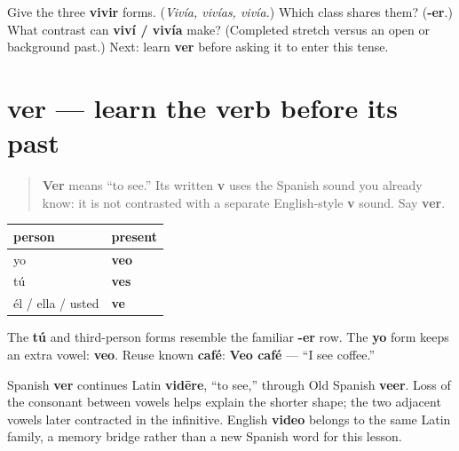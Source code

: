 \begin{tcolorbox}[breakable,colback=teal!4,colframe=teal!35!black,title={Before you move on}]
Give the three \textbf{vivir} forms. (\emph{Vivía, vivías, vivía.}) Which class shares them? (\textbf{-er}.) What contrast can \textbf{viví / vivía} make? (Completed stretch versus an open or background past.) Next: learn \textbf{ver} before asking it to enter this tense.
\end{tcolorbox}
\section[ver]{ver — learn the verb before its past}

\label{lesson:ES-C16-ver}



\begin{quote}
\textbf{Ver} means “to see.” Its written \textbf{v} uses the Spanish sound you already know: it is not contrasted with a separate English-style \textbf{v} sound. Say \textbf{ver}.
\end{quote}

\begin{grammarlens}[title={Grammar Lens: three present forms}]
\noindent
\begin{tabularx}{\linewidth}{@{}>{\raggedright\arraybackslash}X>{\raggedright\arraybackslash}X@{}}
\toprule
\textbf{person} & \textbf{present} \\
\midrule
yo & \textbf{veo} \\
tú & \textbf{ves} \\
él / ella / usted & \textbf{ve} \\
\bottomrule
\end{tabularx}

The \textbf{tú} and third-person forms resemble the familiar \textbf{-er} row. The \textbf{yo} form keeps an extra vowel: \textbf{veo}. Reuse known \textbf{café}: \textbf{Veo café} — “I see coffee.”
\end{grammarlens}

\begin{cousinweb}
Spanish \textbf{ver} continues Latin \textbf{vidēre}, “to see,” through Old Spanish \textbf{veer}. Loss of the consonant between vowels helps explain the shorter shape; the two adjacent vowels later contracted in the infinitive. English \textbf{video} belongs to the same Latin family, a memory bridge rather than a new Spanish word for this lesson.
\end{cousinweb}

